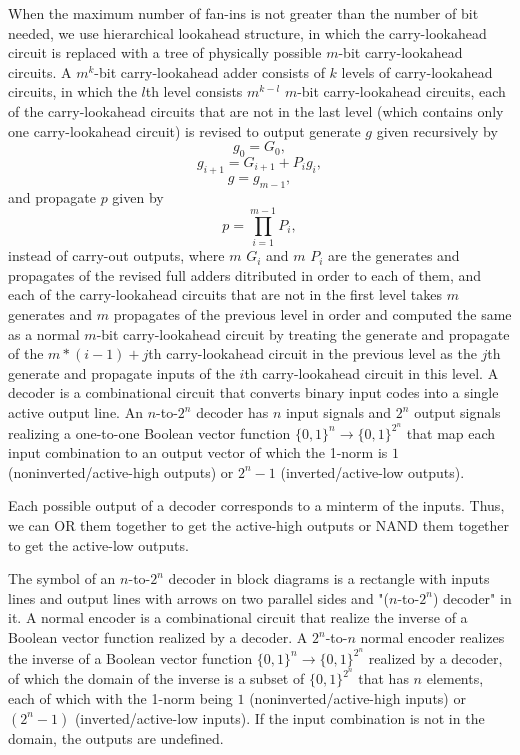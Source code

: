 \documentclass[a4paper,12pt]{article}
\begin{document}
\begin{itemize}
\begin{itemize}
\begin{itemize}
\begin{itemize}
\begin{itemize}
\begin{itemize}
\begin{itemize}
When the maximum number of fan-ins is not greater than the number of bit needed, we use hierarchical lookahead structure, in which the carry-lookahead circuit is replaced with a tree of physically possible $m$-bit carry-lookahead circuits. A $m^k$-bit carry-lookahead adder consists of $k$ levels of carry-lookahead circuits, in which the $l$th level consists $m^{k-l}$ $m$-bit carry-lookahead circuits, each of the carry-lookahead circuits that are not in the last level (which contains only one
carry-lookahead circuit) is revised to output generate $g$ given recursively by
\[g_0=G_0,\]
\[g_{i+1}=G_{i+1}+P_ig_i,\]
\[g=g_{m-1},\]
and propagate $p$ given by
\[p=\prod_{i=1}^{m-1}P_i,\]
instead of carry-out outputs, where $m$ $G_i$ and $m$ $P_i$ are the generates and propagates of the revised full adders ditributed in order to each of them, and each of the carry-lookahead circuits that are not in the first level takes $m$ generates and $m$ propagates of the previous level in order and computed the same as a normal $m$-bit carry-lookahead circuit by treating the generate and propagate of the $m*(i-1)+j$th carry-lookahead circuit in the previous level as the $j$th generate and propagate inputs of the $i$th carry-lookahead circuit in this level.
A decoder is a combinational circuit that converts binary input codes into a single active output line. An $n$-to-$2^n$ decoder has $n$ input signals and $2^n$ output signals realizing a one-to-one Boolean vector function $\{0,1\}^n\to\{0,1\}^{2^n}$ that map each input combination to an output vector of which the 1-norm is $1$ (noninverted/active-high outputs) or $2^n-1$ (inverted/active-low outputs).

Each possible output of a decoder corresponds to a minterm of the inputs. Thus, we can OR them together to get the active-high outputs or NAND them together to get the active-low outputs.

The symbol of an $n$-to-$2^n$ decoder in block diagrams is a rectangle with inputs lines and output lines with arrows on two parallel sides and "($n$-to-$2^n$) decoder" in it.
A normal encoder is a combinational circuit that realize the inverse of a Boolean vector function realized by a decoder. A $2^n$-to-$n$ normal encoder realizes the inverse of a Boolean vector function $\{0,1\}^n\to\{0,1\}^{2^n}$ realized by a decoder, of which the domain of the inverse is a subset of $\{0,1\}^{2^n}$ that has $n$ elements, each of which with the 1-norm being $1$ (noninverted/active-high inputs) or $(2^n-1)$ (inverted/active-low inputs). If the input combination is not in the domain, the outputs are undefined.


\end{itemize}
\end{itemize}
\end{itemize}
\end{itemize}
\end{itemize}
\end{itemize}
\end{itemize}
\end{document}
